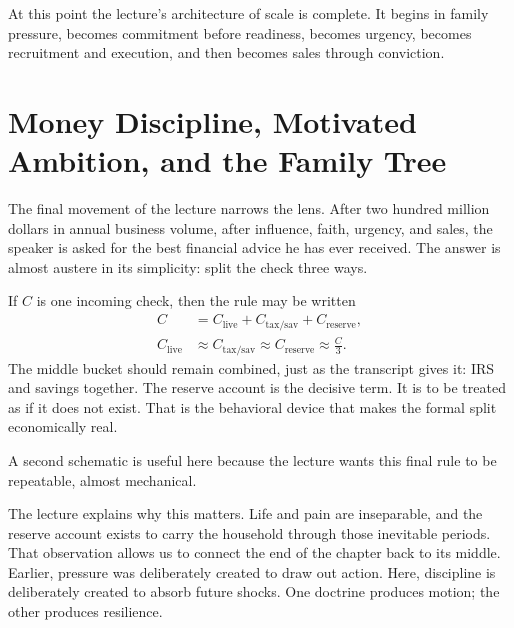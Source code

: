 At this point the lecture's architecture of scale is complete. It begins in family pressure, becomes commitment before readiness, becomes urgency, becomes recruitment and execution, and then becomes sales through conviction.

\section{Money Discipline, Motivated Ambition, and the Family Tree}

The final movement of the lecture narrows the lens. After two hundred million dollars in annual business volume, after influence, faith, urgency, and sales, the speaker is asked for the best financial advice he has ever received. The answer is almost austere in its simplicity: split the check three ways.

If \(C\) is one incoming check, then the rule may be written
\begin{align}
C &= C_{\text{live}} + C_{\text{tax/sav}} + C_{\text{reserve}},\\
C_{\text{live}} &\approx C_{\text{tax/sav}} \approx C_{\text{reserve}} \approx \frac{C}{3}.
\end{align}
The middle bucket should remain combined, just as the transcript gives it: IRS and savings together. The reserve account is the decisive term. It is to be treated as if it does not exist. That is the behavioral device that makes the formal split economically real.

A second schematic is useful here because the lecture wants this final rule to be repeatable, almost mechanical.

\begin{figure}
\centering
{}
\end{figure}

The lecture explains why this matters. Life and pain are inseparable, and the reserve account exists to carry the household through those inevitable periods. That observation allows us to connect the end of the chapter back to its middle. Earlier, pressure was deliberately created to draw out action. Here, discipline is deliberately created to absorb future shocks. One doctrine produces motion; the other produces resilience.

